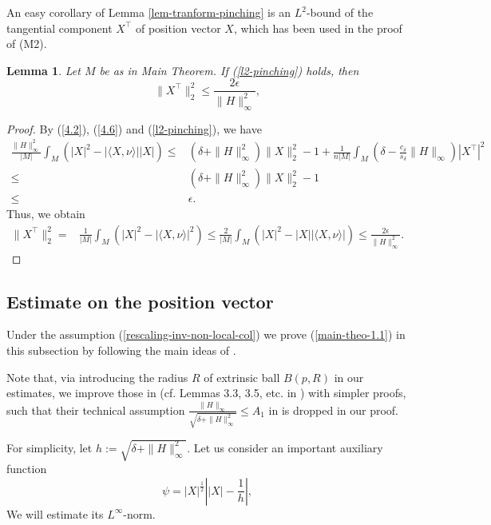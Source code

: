 \documentclass{amsart}
\numberwithin{equation}{section}
\newtheorem{lem}[theo]{Lemma}
\theoremstyle{remark}
\renewcommand{\(}{\left(}
\renewcommand{\)}{\right)}
\renewcommand{\~}{\tilde}
\renewcommand{\-}{\overline}
\renewcommand{\d}{\delta}
\newcommand{\e}{\epsilon}
\begin{document}
An easy corollary of Lemma \ref{lem-tranform-pinching} is an $L^2$-bound of the tangential component $X^\top$ of position vector $X$, which has been used in the proof of (M2).
\begin{lem}\label{lem-l2-bound-perp}
	Let $M$ be as in Main Theorem. If (\ref{l2-pinching}) holds, then
	\begin{equation}
	\|X^\top\|_2^2 \leq \frac{2\e}{\|H\|_\infty^2},\label{l2-bound-perp-position}
	\end{equation}
\end{lem}
\begin{proof}
	By (\ref{4.2}), (\ref{4.6}) and (\ref{l2-pinching}), we have
	\begin{align*}
	\frac{\|H\|_\infty^2}{|M|} \int_M \(|X|^2-|\langle X,\nu\rangle| |X|\)
	\leq &(\d+\|H\|_\infty^2)\|X\|_2^2-1+\frac{1}{n|M|}\int_M \(\d-\frac{c_\d}{ s_\d}\|H\|_\infty\)|X^\top|^2 \\
	\leq &(\d+\|H\|_\infty^2)\|X\|_2^2-1\\
	\leq &\e.
	\end{align*}
	Thus, we obtain
	\begin{align*}
	\|X^\top\|_2^2=&\frac{1}{|M|}\int_M \(|X|^2-|\langle X,\nu\rangle|^2\)
	\leq \frac{2}{|M|}\int_M \(|X|^2-|X||\langle X,\nu\rangle|\)
	\leq \frac{2\e}{\|H\|_\infty^2}.
	\end{align*}
\end{proof}

\subsection{Estimate on the position vector}
Under the assumption (\ref{rescaling-inv-non-local-col}) we prove (\ref{main-theo-1.1}) in this subsection by following the main ideas of \cite{Colbois-Grosjean2007}.

Note that, via introducing the radius $R$ of extrinsic ball $B(p,R)$ in our estimates, we improve those in \cite{Grosjean-Roth2012} (cf. Lemmas 3.3, 3.5, etc. in \cite{Grosjean-Roth2012}) with simpler proofs, such that their technical assumption $\frac{\|H\|_\infty}{\sqrt{\d+\|H\|_\infty^2}}\le A_1$  in \cite{Grosjean-Roth2012} is dropped in our proof.


For simplicity, let $h:=\sqrt{\d+\|H\|_\infty^2}$. Let us consider an important auxiliary function
\begin{equation}\label{aux-func}
\psi=|X|^\frac{1}{2}\left| |X|-\frac{1}{h} \right|,
\end{equation}
We will estimate its $L^\infty$-norm.
\end{document}
